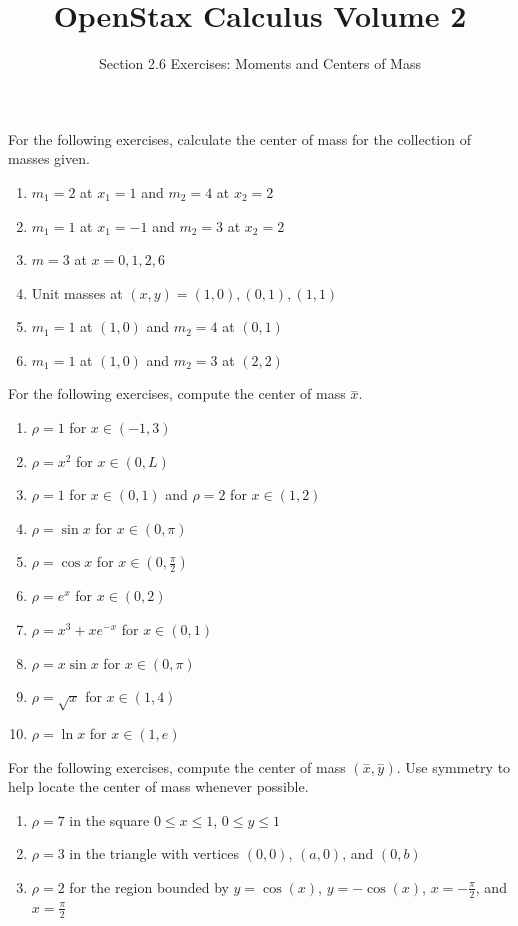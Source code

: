 \documentclass{exercises}
\title{OpenStax Calculus Volume 2}
\subtitle{Section 2.6 Exercises: Moments and Centers of Mass}
\author{}
\date{}
\begin{document}
\maketitle


For the following exercises, calculate the center of mass for the collection of masses given.

\begin{enumerate}[start=1]
\item $m_{1}=2$ at $x_{1}=1$ and $m_{2}=4$ at $x_{2}=2$
\item $m_{1}=1$ at $x_{1}=-1$ and $m_{2}=3$ at $x_{2}=2$
\item $m=3$ at $x=0,1,2,6$
\item Unit masses at $(x,y)=(1,0),(0,1),(1,1)$
\item $m_{1}=1$ at $(1,0)$ and $m_{2}=4$ at $(0,1)$
\item $m_{1}=1$ at $(1,0)$ and $m_{2}=3$ at $(2,2)$
\end{enumerate}

For the following exercises, compute the center of mass $\overset{-}{x}$.

\begin{enumerate}[resume]
\item $\rho=1$ for $x\in(-1,3)$
\item $\rho=x^{2}$ for $x\in(0,L)$
\item $\rho=1$ for $x\in(0,1)$ and $\rho=2$ for $x\in(1,2)$
\item $\rho=\sin x$ for $x\in(0,\pi)$
\item $\rho=\cos x$ for $x\in(0,\frac{\pi}{2})$
\item $\rho=e^{x}$ for $x\in(0,2)$
\item $\rho=x^{3}+xe^{-x}$ for $x\in(0,1)$
\item $\rho=x\sin x$ for $x\in(0,\pi)$
\item $\rho=\sqrt{x}$ for $x\in(1,4)$
\item $\rho=\ln x$ for $x\in(1,e)$
\end{enumerate}

For the following exercises, compute the center of mass $(\overset{-}{x},\overset{-}{y})$. Use symmetry to help locate the center of mass whenever possible.

\begin{enumerate}[resume]
\item $\rho=7$ in the square $0\le x\le1$, $0\le y\le1$
\item $\rho=3$ in the triangle with vertices $(0,0)$, $(a,0)$, and $(0,b)$
\item $\rho=2$ for the region bounded by $y=\cos(x)$, $y=-\cos(x)$, $x=-\frac{\pi}{2}$, and $x=\frac{\pi}{2}$
\end{enumerate}
\end{document}
